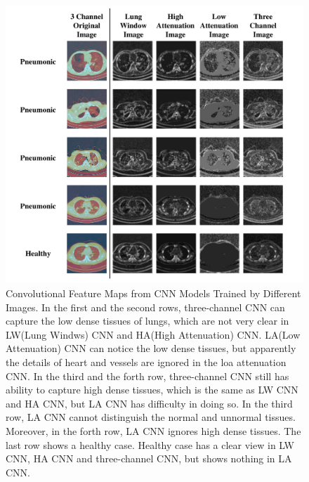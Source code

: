\documentclass[journal]{IEEEtran}
\begin{document}
\begin{figure}[t]
\centerline{\includegraphics[width=180mm]{show.pdf}}
\vspace{-0cm}
\caption{Convolutional Feature Maps from CNN Models Trained by Different Images. In the first and the second rows, three-channel CNN can capture the low dense tissues of lungs, which are not very clear in LW(Lung Windws) CNN and HA(High Attenuation) CNN. LA(Low Attenuation) CNN can notice the low dense tissues, but apparently the details of heart and vessels are ignored in the loa attenuation CNN. 
In the third and the forth row, three-channel CNN still has ability to capture high dense tissues, which is the same as LW CNN and HA CNN, but LA CNN has difficulty in doing so. In the third row, LA CNN cannot distinguish the normal and unnormal tissues. Moreover, in the forth row, LA CNN ignores high dense tissues. The last row shows a healthy case. Healthy case has a clear view in LW CNN, HA CNN and three-channel CNN, but shows nothing in LA CNN.}
\vspace{-0cm}
\label{show}
\end{figure}
\end{document}
